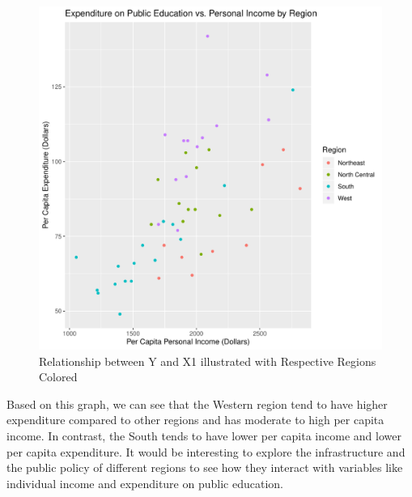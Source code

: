 \documentclass[12pt,letterpaper]{article}
\begin{document}
\begin{itemize}
\newpage
\begin{figure} [h]
	\centering
	\includegraphics[width=0.9\linewidth]{Graph5}
	\caption{Relationship between Y and X1 illustrated with Respective Regions Colored}
	\label{fig:graph2}
\end{figure}

\noindent Based on this graph, we can see that the Western region tend to have higher expenditure compared to other regions and has moderate to high per capita income. In contrast, the South tends to have lower per capita income and lower per capita expenditure. It would be interesting to explore the infrastructure and the public policy of different regions to see how they interact with variables like individual income and expenditure on public education.

\end{itemize}
\end{document}
